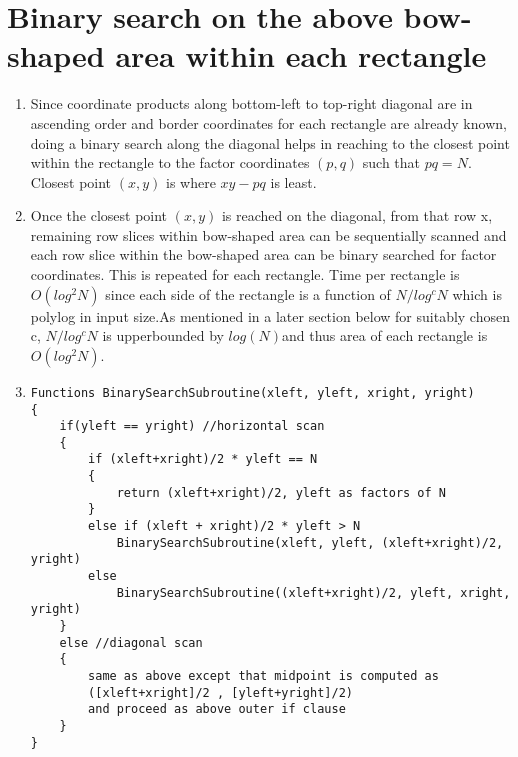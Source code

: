 \documentclass[11pt,onecolumn]{article}
\begin{document}
\section{Binary search on the above bow-shaped area within each rectangle}
\begin{enumerate}
\item Since coordinate products along bottom-left to top-right diagonal are in ascending order and border coordinates for each rectangle are already known, doing a binary search along the diagonal helps in reaching to the closest point within the rectangle to the factor coordinates $(p,q)$ such that $pq=N$. Closest point $(x,y)$ is where $xy-pq$ is least.
\item Once the closest point $(x,y)$ is reached on the diagonal, from that row x, remaining row slices within bow-shaped area can be sequentially scanned and each row slice within the bow-shaped area can be 
binary searched for factor coordinates. This is repeated for each rectangle. Time per rectangle is $O(log^{2}N)$ since each side of the rectangle is a function of $N/log^{c}N$ which is polylog in input size.As mentioned in a later section below for suitably chosen c, $N/log^{c}N$ is upperbounded by $log(N)$and thus area of each rectangle is $O(log^{2}N)$.
\item \begin{verbatim}
Functions BinarySearchSubroutine(xleft, yleft, xright, yright)
{
	if(yleft == yright) //horizontal scan
	{
		if (xleft+xright)/2 * yleft == N
		{
			return (xleft+xright)/2, yleft as factors of N
		}
		else if (xleft + xright)/2 * yleft > N
			BinarySearchSubroutine(xleft, yleft, (xleft+xright)/2, yright)
		else
			BinarySearchSubroutine((xleft+xright)/2, yleft, xright, yright)
	}
	else //diagonal scan
	{
		same as above except that midpoint is computed as
		([xleft+xright]/2 , [yleft+yright]/2)
		and proceed as above outer if clause
	}
}
\end{verbatim}

\end{enumerate}
\end{document}
